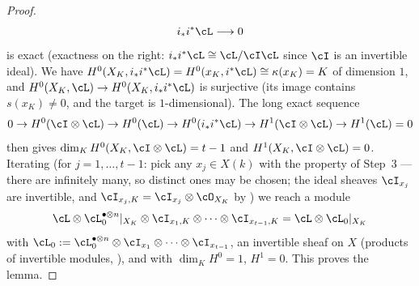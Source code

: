 \begin{proof}
\[i_*i^*\cL\longrightarrow0
\]
is exact (exactness on the right: $i_*i^*\cL\cong\cL/\cI\cL$ since
$\cI$ is an invertible ideal).  We have
$H^0(X_K,i_*i^*\cL)=H^0(x_K,i^*\cL)\cong\kappa(x_K)=K$ of dimension $1$,
and $H^0(X_K,\cL)\to H^0(X_K,i_*i^*\cL)$ is surjective (its image
contains $s(x_K)\neq0$, and the target is $1$-dimensional).  The long
exact sequence
\[
0\to H^0(\cI\otimes\cL)\to H^0(\cL)\to H^0(i_*i^*\cL)\to
H^1(\cI\otimes\cL)\to H^1(\cL)=0
\]
then gives $\dim_KH^0(X_K,\cI\otimes\cL)=t-1$ and
$H^1(X_K,\cI\otimes\cL)=0$.
Iterating (for $j=1,\dots,t-1$: pick any $x_j\in X(k)$ with the property
of Step~3 — there are infinitely many, so distinct ones may be chosen;
the ideal sheaves $\cI_{x_j}$ are invertible, and
$\cI_{x_j,K}=\cI_{x_j}\otimes\cO_{X_K}$ by )
we reach a module
\[
\cL\otimes\cL_0^{\bullet\otimes n}|_{X_K}\otimes
\cI_{x_1,K}\otimes\cdots\otimes\cI_{x_{t-1},K}
=\cL\otimes\cL_0|_{X_K}
\]
with $\cL_0:=\cL_0^{\bullet\otimes n}\otimes\cI_{x_1}\otimes\cdots\otimes
\cI_{x_{t-1}}$, an invertible sheaf on $X$ (products of invertible
modules, ), and with
$\dim_KH^0=1$, $H^1=0$.  This proves the lemma.
\end{proof}

